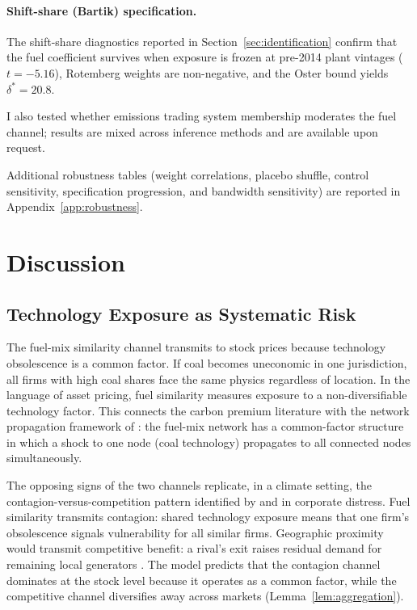 \documentclass[12pt,a4paper]{article}
\begin{document}
\paragraph{Shift-share (Bartik) specification.}
The shift-share diagnostics reported in Section~\ref{sec:identification} confirm that the fuel coefficient survives when exposure is frozen at pre-2014 plant vintages ($t = -5.16$), Rotemberg weights are non-negative, and the Oster bound yields $\delta^* = 20.8$.

I also tested whether emissions trading system membership moderates the fuel channel; results are mixed across inference methods and are available upon request.

Additional robustness tables (weight correlations, placebo shuffle, control sensitivity, specification progression, and bandwidth sensitivity) are reported in Appendix~\ref{app:robustness}.


\section{Discussion}\label{sec:discussion}

\subsection{Technology Exposure as Systematic Risk}\label{sec:systematic}

The fuel-mix similarity channel transmits to stock prices because technology obsolescence is a common factor. If coal becomes uneconomic in one jurisdiction, all firms with high coal shares face the same physics regardless of location. In the language of asset pricing, fuel similarity measures exposure to a non-diversifiable technology factor. This connects the carbon premium literature \citep{Bolton2021, BoltonKacperczyk2023} with the network propagation framework of \citet{AcemogluCarvalhoOzdaglarTahbazSalehi2012}: the fuel-mix network has a common-factor structure in which a shock to one node (coal technology) propagates to all connected nodes simultaneously.

The opposing signs of the two channels replicate, in a climate setting, the contagion-versus-competition pattern identified by \citet{LangStulz1992} and \citet{JorionZhang2007} in corporate distress. Fuel similarity transmits contagion: shared technology exposure means that one firm's obsolescence signals vulnerability for all similar firms. Geographic proximity would transmit competitive benefit: a rival's exit raises residual demand for remaining local generators \citep{DavisHausman2016}. The model predicts that the contagion channel dominates at the stock level because it operates as a common factor, while the competitive channel diversifies away across markets (Lemma~\ref{lem:aggregation}).
\end{document}
